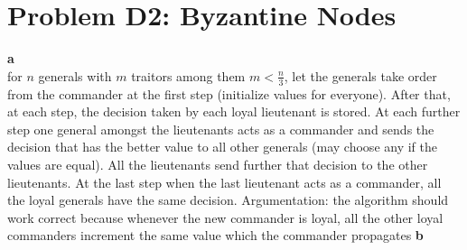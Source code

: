 \documentclass{article}
\begin{document}
	\section*{	Problem D2: Byzantine Nodes }
	\textbf{a} \\
	for $n$ generals with $m$ traitors among them $ m < \frac{n}{3}$,
	let the generals take order from the commander at the first step (initialize values for everyone). After that, at each step, the decision taken by each loyal lieutenant is stored. At each further step one general amongst the lieutenants acts as a commander and sends the decision that has the better value to all other generals (may choose any if the values are equal). All the lieutenants send further that decision to the other lieutenants. At the last step when the last lieutenant acts as a commander, all the loyal generals have the same decision. 
	Argumentation: the algorithm should work correct  because whenever the new commander is loyal, all the other loyal commanders increment the same value which the commander propagates
	\textbf{b} \\
\end{document}
